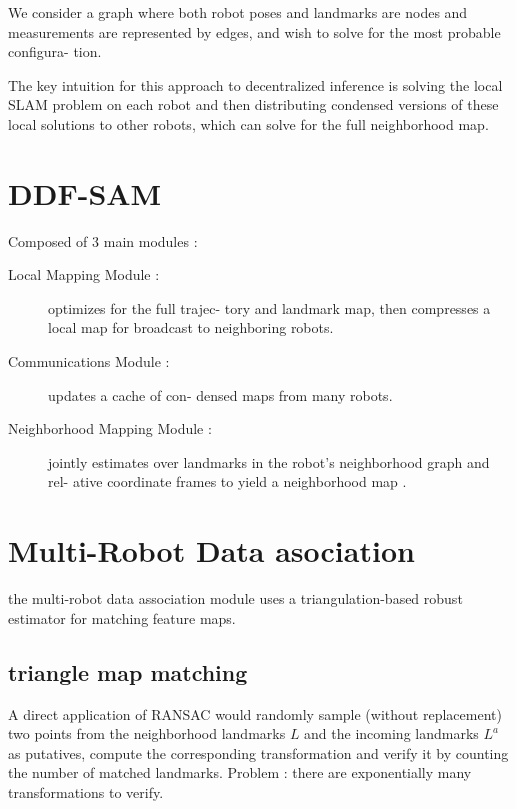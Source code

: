 \documentclass[twoside,twocolumn]{article}
\begin{document}
We consider a graph where both robot poses
and landmarks are nodes and measurements are represented
by edges, and wish to solve for the most probable configura-
tion.

The  key
intuition   for   this   approach   to   decentralized   inference   is
solving  the  local  SLAM  problem  on  each  robot  and  then
distributing  condensed  versions  of  these  local  solutions  to
other robots, which can solve for the full neighborhood map.



\section{DDF-SAM}
Composed of 3 main modules :
\begin{description}
 \item[Local Mapping Module
 :]  optimizes  for  the  full  trajec-
 tory and landmark map, then compresses a local map
 for broadcast to neighboring robots.
 \item [Communications Module
 :]  updates  a  cache  of  con-
 densed maps from many robots.
 \item [Neighborhood Mapping Module
 :] jointly estimates over
 landmarks in the robot’s neighborhood graph and rel-
 ative coordinate frames to yield a
 neighborhood map
 .
\end{description}


\section{Multi-Robot Data asociation}
the multi-robot
data  association  module  uses  a  triangulation-based  robust
estimator  for  matching  feature  maps.

\subsection{triangle map matching}
A  direct  application  of  RANSAC  \cite{fischler_random_1981}  would  randomly
sample  (without  replacement)  two  points  from  the  neighborhood  landmarks
$L$
and  the  incoming  landmarks
$L^a$
as
putatives,  compute  the  corresponding  transformation  and
verify it by counting the number of matched landmarks.
Problem : there  are  exponentially  many  transformations  to
verify.
\end{document}

